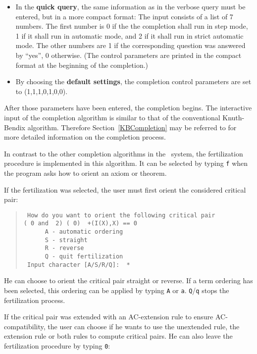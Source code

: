 \begin{itemize}
\begin{itemize}
\end{itemize}

\item
In the {\bf quick query}, the same information as in the verbose query
must be entered, but in a more compact format: The input consists of a
list of 7 numbers.  The first number is 0 if the the completion shall
run in step mode, 1 if it shall run in automatic mode, and 2 if it
shall run in strict automatic mode. The other numbers are 1 if the
corresponding question was answered by ``yes'', 0 otherwise.
(The control parameters are printed in the compact format at the
beginning of the completion.)

\item
By choosing the {\bf default settings}, the completion control parameters
are set to (1,1,1,0,1,0,0).
\end{itemize}

After those parameters have been entered, the completion begins.  The
interactive input of the completion algorithm is similar to that of the
conventional Knuth-Bendix algorithm. Therefore
Section~\ref{KBCompletion} may be referred to for more detailed
information on the completion process.

In contrast to the other completion algorithms in the \redux\  system, the
fertilization procedure is implemented in this algorithm.  It can be
selected by typing {\tt f} when the program asks how to orient an axiom
or theorem.

If the fertilization was selected, the user must first orient the
considered critical pair:
\begin{quote}
\begin{verbatim}
 How do you want to orient the following critical pair
( 0 and  2) ( 0)  +(I(X),X) == 0
      A - automatic ordering
      S - straight
      R - reverse
      Q - quit fertilization
 Input character [A/S/R/Q]:  *
\end{verbatim}
\end{quote}
He can choose to orient the critical pair straight or reverse.  If a
term ordering has been selected, this ordering can be applied by typing
{\tt A} or {\tt a}.  {\tt Q}/{\tt q} stops the fertilization process.

If the critical pair was extended with an AC-extension rule to ensure
AC-compatibility, the user can choose if he wants to use the unextended
rule, the extension rule or both rules to compute critical pairs.  He
can also leave the fertilization procedure by typing {\tt 0}:

